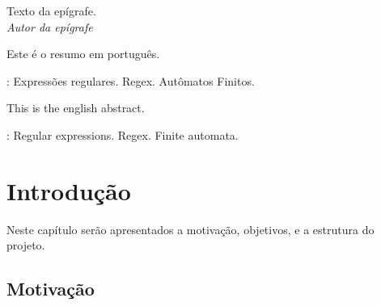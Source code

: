 \documentclass[a4paper,12pt,oneside,onecolumn]{uerj}
\begin{document}
  \vfill\vfill\vfill\vfill
  \begin{flushright}
    Texto da epígrafe.\\
    \textsl{Autor da epígrafe}
  \end{flushright}
  \vfill




Este é o resumo em português.

: Expressões regulares. Regex. Autômatos Finitos.



This is the english abstract.

: Regular expressions. Regex. Finite automata.


\listadefiguras
\listadetabelas


\sumario


\mainmatter

\chapter{Introdução}

Neste capítulo serão apresentados a motivação, objetivos, e a estrutura do projeto.

\section{Motivação}
\end{document}
